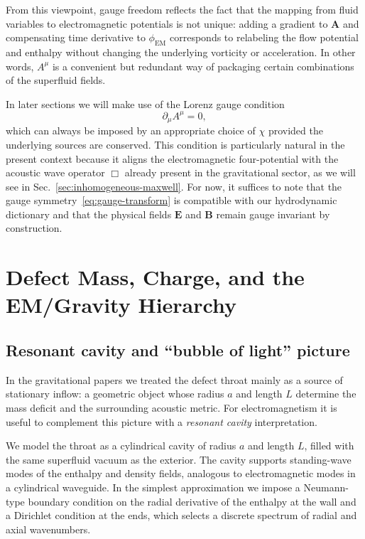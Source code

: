 \documentclass[11pt]{article}
\begin{document}
From this viewpoint, gauge freedom reflects the fact that the mapping from fluid variables to electromagnetic potentials is not unique: adding a gradient to $\mathbf{A}$ and compensating time derivative to $\phi_{\mathrm{EM}}$ corresponds to relabeling the flow potential and enthalpy without changing the underlying vorticity or acceleration.  In other words, $A^\mu$ is a convenient but redundant way of packaging certain combinations of the superfluid fields.

In later sections we will make use of the Lorenz gauge condition
\begin{equation}
\partial_\mu A^\mu = 0,
\label{eq:lorenz-gauge-main}
\end{equation}
which can always be imposed by an appropriate choice of $\chi$ provided the underlying sources are conserved.  This condition is particularly natural in the present context because it aligns the electromagnetic four-potential with the acoustic wave operator $\Box$ already present in the gravitational sector, as we will see in Sec.~\ref{sec:inhomogeneous-maxwell}.  For now, it suffices to note that the gauge symmetry~\eqref{eq:gauge-transform} is compatible with our hydrodynamic dictionary and that the physical fields $\mathbf{E}$ and $\mathbf{B}$ remain gauge invariant by construction.

\section{Defect Mass, Charge, and the EM/Gravity Hierarchy}
\label{sec:defect-hierarchy}

\subsection{Resonant cavity and ``bubble of light'' picture}

In the gravitational papers we treated the defect throat mainly as a source of stationary inflow: a geometric object whose radius $a$ and length $L$ determine the mass deficit and the surrounding acoustic metric.  For electromagnetism it is useful to complement this picture with a \emph{resonant cavity} interpretation.

We model the throat as a cylindrical cavity of radius $a$ and length $L$, filled with the same superfluid vacuum as the exterior.  The cavity supports standing-wave modes of the enthalpy and density fields, analogous to electromagnetic modes in a cylindrical waveguide.  In the simplest approximation we impose a Neumann-type boundary condition on the radial derivative of the enthalpy at the wall and a Dirichlet condition at the ends, which selects a discrete spectrum of radial and axial wavenumbers.
\end{document}
